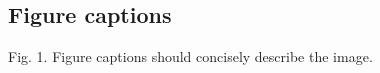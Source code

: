 \documentclass[12pt,letterpaper]{article}
\begin{document}
\begin{flushleft}
	

\newpage %
\section*{Figure captions}
Fig. 1. Figure captions should concisely describe the image.


\end{flushleft}
\end{document}
